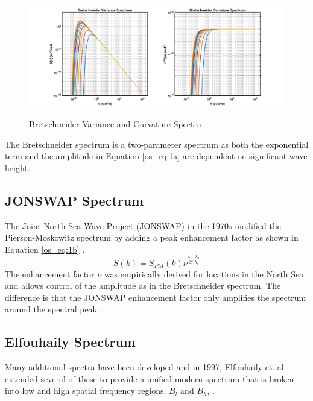  \begin{figure}[H]
  \begin{center}
\includegraphics[width=6in]{../media/Ocean_Surface/bs_variance_curvature_spectrum.png}
  \end{center}
  \renewcommand{\baselinestretch}{1} \small\normalsize
  \begin{quote}
    \caption[Bretschneider Variance and Curvature Spectra]{Bretschneider Variance and Curvature Spectra\label{os_fig:1a}}
  \end{quote}
\end{figure}
 \renewcommand{\baselinestretch}{2} \small\normalsize
The Bretschneider spectrum is a two-parameter spectrum as both the exponential term and the amplitude in Equation \ref{os_eq:1a} are dependent on significant wave height.

\subsection{JONSWAP Spectrum}
The Joint North Sea Wave Project (JONSWAP) in the 1970s modified the Pierson-Moskowitz spectrum by adding a peak enhancement factor as shown in Equation \ref{os_eq:1b} \cite{michel_sea_spectra}.
\begin{equation}
  \label{os_eq:1b}
  S(k) = S_{PM}(k)\nu^{\frac{k-k_0}{2\sigma^2k_0}} 
  \end{equation}
The enhancement factor $\nu$ was empirically derived for locations in the North Sea and allows control of the amplitude as in the Bretschneider spectrum. The difference is that the JONSWAP enhancement factor only amplifies the spectrum around the spectral peak.

\subsection{Elfouhaily Spectrum}
Many additional spectra have been developed and in 1997, Elfouhaily et. al extended several of these to provide a unified modern spectrum that is broken into low and high spatial frequency regions, $B_l$ and $B_h$, \cite{elfouhaily}. 

